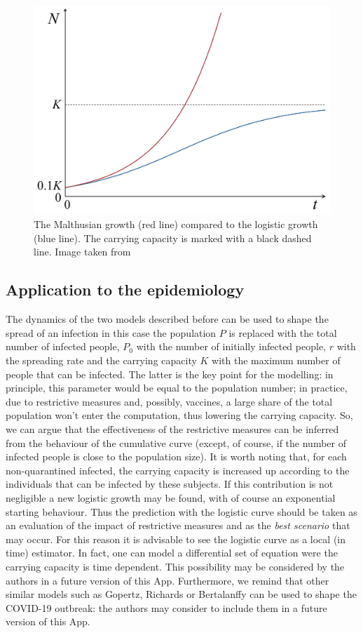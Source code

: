 \documentclass[
12pt, %
a4paper, %
oneside, %
headinclude,footinclude, %
BCOR5mm, %
]{scrartcl}
\begin{document}
\begin{figure}
 \centering
 \includegraphics[width=0.8\linewidth]{Figures/Malthusian_growth_vs_logistic_growth-2.jpg} 
 \caption{The Malthusian growth (red line) compared to the logistic growth (blue line). The carrying capacity is marked with a black dashed line. Image taken from \cite{malthus_vs_logistic}}
 \label{Malthusian_growth_vs_logistic_growth}
\end{figure}

\subsection{Application to the epidemiology}

The dynamics of the two models described before can be used to shape the spread of an infection \cite{serfling1952historical,ma2014estimating} in this case the population $P$ is replaced with the total number of infected people, $P_{0}$ with the number of initially infected people, $r$ with the spreading rate and the carrying capacity $K$ with the maximum number of people that can be infected. The latter is the key point for the modelling: in principle, this parameter would be equal to the population number; in practice, due to restrictive measures and, possibly, vaccines, a large share of the total population won't enter the computation, thus lowering the carrying capacity. So, we can argue that the effectiveness of the restrictive measures can be inferred from the behaviour of the cumulative curve (except, of course, if the number of infected people is close to the population size). It is worth noting that, for each non-quarantined infected, the carrying capacity is increased up according to the individuals that can be infected by these subjects. If this contribution is not negligible a new logistic growth may be found, with of course an exponential starting behaviour. Thus the prediction with the logistic curve should be taken as an evaluation of the impact of restrictive measures and as the \emph{best scenario} that may occur. For this reason it is advisable to see the logistic curve as a local (in time) estimator. 
In fact, one can model a differential set of equation were the carrying capacity is time dependent. This possibility may be considered  by the authors in a future version of this App. Furthermore, we remind that other similar models such as Gopertz, Richards or Bertalanffy can be used to shape the COVID-19 outbreak\cite{ma2014estimating}: the authors may consider to include them in a future version of this App.
\end{document}
